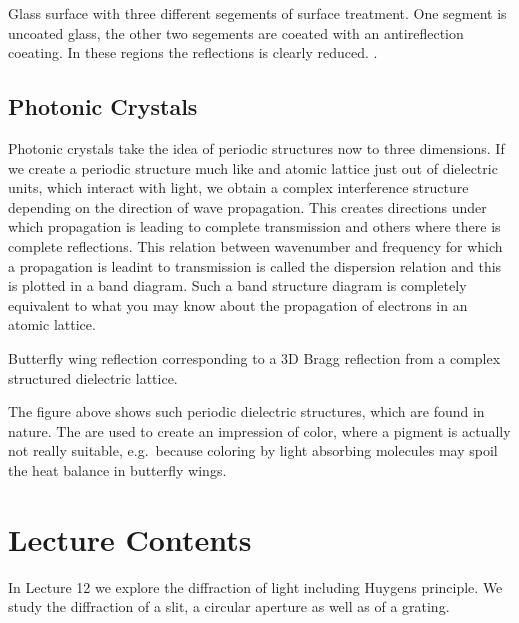 \documentclass[letterpaper,10pt,english]{sphinxmanual}
\begin{document}



 Glass surface with three different segements of surface treatment. One segment is uncoated glass, the other two segements are coeated with an anti\sphinxhyphen{}reflection coeating. In these regions the reflections is clearly reduced. .






\subsection{Photonic Crystals}
\label{\detokenize{notebooks/L11/Interference:Photonic-Crystals}}
Photonic crystals take the idea of periodic structures now to three dimensions. If we create a periodic structure much like and atomic lattice just out of dielectric units, which interact with light, we obtain a complex interference structure depending on the direction of wave propagation. This creates directions under which propagation is leading to complete transmission and others where there is complete reflections. This relation between wavenumber and frequency for which a propagation is
leadint to transmission is called the dispersion relation and this is plotted in a band diagram. Such a band structure diagram is completely equivalent to what you may know about the propagation of electrons in an atomic lattice.






 Butterfly wing reflection corresponding to a 3D Bragg reflection from a complex structured dielectric lattice.





The figure above shows such periodic dielectric structures, which are found in nature. The are used to create an impression of color, where a pigment is actually not really suitable, e.g. because coloring by light absorbing molecules may spoil the heat balance in butterfly wings.


\section{Lecture Contents}
\label{\detokenize{lectures/L12/overview_12:lecture-contents}}\label{\detokenize{lectures/L12/overview_12::doc}}
In Lecture 12 we explore the diffraction of light including Huygens principle. We study the diffraction of a slit, a circular aperture as well as of a grating.
\end{document}
